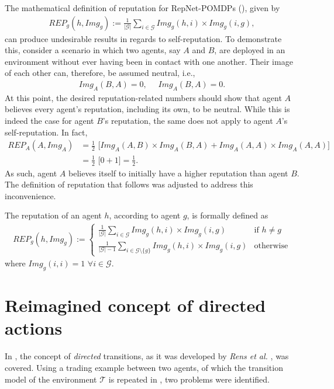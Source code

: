 The mathematical definition of reputation for RepNet-POMDPs (), given by
\begin{align}
    REP_g(h, Img_g) := \frac{1}{|\mathcal{G}|} \sum_{i \in \mathcal{G}} Img_g(h,i) \times Img_g(i,g),
\end{align}
can produce undesirable results in regards to self-reputation. To demonstrate this, consider a scenario in which two agents, say $A$ and $B$, are deployed in an environment without ever having been in contact with one another. Their image of each other can, therefore, be assumed neutral, i.e.,
\begin{align}
    Img_A(B, A) = 0, \,\,\,\,\,\,\,\, Img_A(B,A) = 0.
\end{align}
At this point, the desired reputation-related numbers should show that agent $A$ believes every agent's reputation, including its own, to be neutral. While this is indeed the case for agent $B$'s reputation, the same does not apply to agent $A$'s self-reputation. In fact,
\begin{align*}
\label{eq:selfrep2}
    REP_A(A, Img_A) &= \frac{1}{2} \,\, \big[ Img_A(A,B) \times Img_A(B,A) + Img_A(A,A) \times Img_A(A,A) \big]
    \\&= \frac{1}{2} \,\, \big[ 0 + 1\big] = \frac{1}{2}.
\end{align*}
As such, agent $A$ believes itself to initially have a higher reputation than agent $B$. The definition of reputation that follows was adjusted to address this inconvenience.


\begin{definition}
\label{def:repnew}
The reputation of an agent $h$, according to agent $g$, is formally defined as 
\begin{align*}
      REP_g(h, Img_g) := 
    \begin{cases}
    \frac{1}{|\mathcal{G}|} \sum_{i \in \mathcal{G}} Img_g(h,i) \times Img_g(i,g) & \mbox{if } h \neq g
    \\
    \frac{1}{|\mathcal{G}|-1} \sum_{i \in \mathcal{G} \setminus \{ g \}} Img_g(h,i) \times Img_g(i,g) & \mbox{otherwise}
    \end{cases}
\end{align*}
where $Img_g(i,i) = 1 \,\,\forall i \in \mathcal{G}$.
\end{definition}





\section{Reimagined concept of directed actions}
\label{sec:reimagined}
In , the concept of \textit{directed} transitions, as it was developed by \textit{Rens et al.} \cite{rensetal}, was covered. Using a trading example between two agents, of which the transition model of the environment $\mathcal{T}$ is repeated in , two problems were identified.


